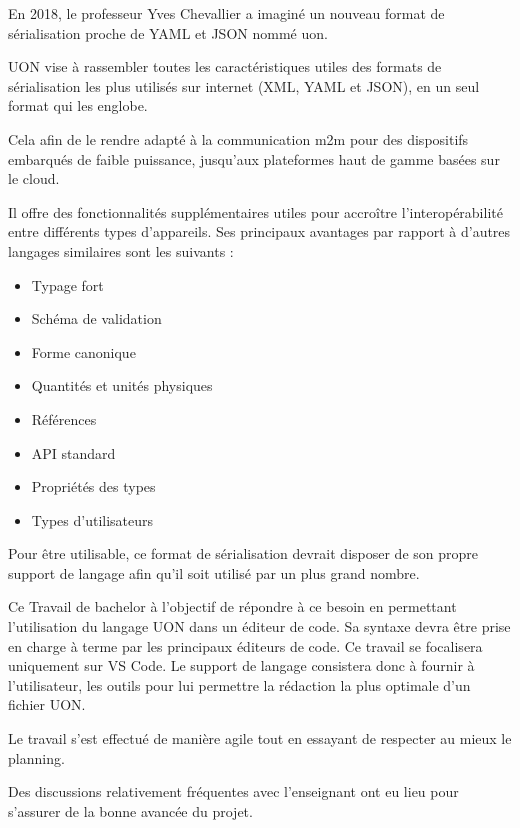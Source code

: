 
En 2018, le professeur Yves Chevallier a imaginé un nouveau format de sérialisation proche de YAML et JSON nommé \Gls{uon}.

UON vise à rassembler toutes les caractéristiques utiles des formats de sérialisation les plus utilisés sur internet (XML, YAML et JSON),
en un seul format qui les englobe.

Cela afin de le rendre adapté à la communication \Gls{m2m} pour des dispositifs embarqués de faible puissance, jusqu'aux plateformes haut de gamme basées sur le cloud.

Il offre des fonctionnalités supplémentaires utiles pour accroître l'interopérabilité entre différents types d'appareils. Ses principaux avantages par rapport à d'autres langages similaires sont les suivants :

\begin{itemize}
    \item Typage fort
    \item Schéma de validation
    \item Forme canonique
    \item Quantités et unités physiques
    \item Références
    \item API standard
    \item Propriétés des types
    \item Types d'utilisateurs
\end{itemize}

Pour être utilisable, ce format de sérialisation devrait disposer de son propre support de langage afin qu'il soit utilisé par un plus grand nombre.

Ce Travail de bachelor à l'objectif de répondre à ce besoin en permettant l'utilisation du langage UON dans un éditeur de code.
Sa syntaxe devra être prise en charge à terme par les principaux éditeurs de code. Ce travail se focalisera uniquement sur VS Code.
Le support de langage consistera donc à fournir à l'utilisateur, les outils pour lui permettre la rédaction la plus optimale d'un fichier UON.

Le travail s'est effectué de manière agile tout en essayant de respecter au mieux le planning.

Des discussions relativement fréquentes avec l'enseignant ont eu lieu pour s'assurer de la bonne avancée du projet.

